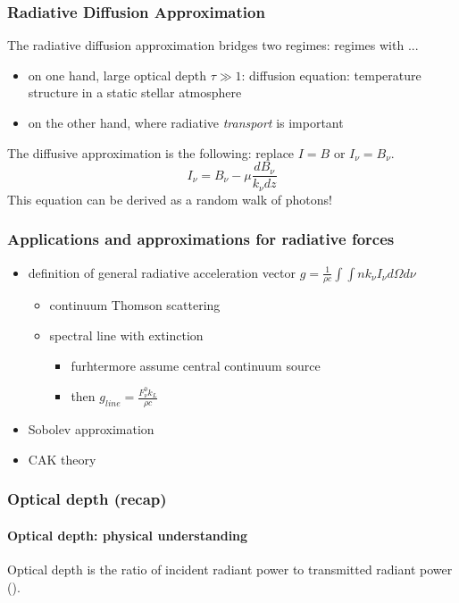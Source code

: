 \documentclass[../main/main.tex]{subfiles}
\begin{document}
\subsubsection{Radiative Diffusion Approximation} The radiative diffusion approximation bridges two regimes: regimes with ... 
\begin{itemize}
\item on one hand, large optical depth $\tau \gg 1$: diffusion equation: temperature structure in a static stellar atmosphere
\item on the other hand, where radiative \textit{transport} is important
\end{itemize}
The diffusive approximation is the following: replace $\boxed{I = B}$ or $I_{\nu} = B_{\nu}$.
\begin{equation}
I_{\nu} = B_{\nu} - \mu \frac{dB_{\nu}}{k_{\nu}dz}
\end{equation}
This equation can be derived as a random walk of photons!


\subsubsection{Applications and approximations for radiative forces}
\begin{itemize}
\item definition of general radiative acceleration vector $g = \frac{1}{\rho c}\int \int n k_{\nu} I_{\nu} d\Omega d\nu$
\begin{itemize}
\item continuum Thomson scattering
\item spectral line with extinction
\begin{itemize}
\item furhtermore assume central continuum source
\item then $g_{line} = \frac{F_{\nu}^0 k_L}{\rho c}$
\end{itemize}
\end{itemize}

\item Sobolev approximation
\item CAK theory
\end{itemize}

\newpage
\subsubsection{Optical depth (recap)}
\paragraph{Optical depth: physical understanding}
Optical depth is the ratio of incident radiant power to transmitted radiant power (\cite{WikiOpticalDepth}).
\end{document}
